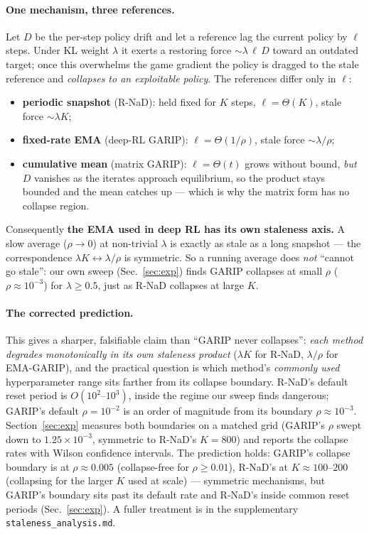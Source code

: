 \documentclass[10pt,twocolumn]{article}
\theoremstyle{plain}
\theoremstyle{remark}
\begin{document}
\paragraph{One mechanism, three references.} Let $D$ be the per-step policy
drift and let a reference lag the current policy by $\ell$ steps. Under KL weight
$\lambda$ it exerts a restoring force $\sim\!\lambda\,\ell\,D$ toward an outdated
target; once this overwhelms the game gradient the policy is dragged to the stale
reference and \emph{collapses to an exploitable policy}. The references differ
only in $\ell$:
\begin{itemize}
  \item \textbf{periodic snapshot} (R-NaD): held fixed for $K$ steps,
  $\ell=\Theta(K)$, stale force $\sim\!\lambda K$;
  \item \textbf{fixed-rate EMA} (deep-RL GARIP): $\ell=\Theta(1/\rho)$, stale
  force $\sim\!\lambda/\rho$;
  \item \textbf{cumulative mean} (matrix GARIP): $\ell=\Theta(t)$ grows without
  bound, \emph{but} $D$ vanishes as the iterates approach equilibrium, so the
  product stays bounded and the mean catches up --- which is why the matrix form
  has no collapse region.
\end{itemize}
Consequently \textbf{the EMA used in deep RL has its own staleness axis.} A slow average ($\rho\!\to\!0$) at non-trivial $\lambda$ is exactly as
stale as a long snapshot --- the correspondence $\lambda K \leftrightarrow
\lambda/\rho$ is symmetric. So a running average does \emph{not} ``cannot go
stale'': our own sweep (Sec.~\ref{sec:exp}) finds GARIP collapses at small $\rho$
($\rho\!\approx\!10^{-3}$) for $\lambda\!\ge\!0.5$, just as R-NaD collapses at
large $K$.

\paragraph{The corrected prediction.} This gives a sharper, falsifiable claim
than ``GARIP never collapses'': \emph{each method degrades monotonically in its
own staleness product} ($\lambda K$ for R-NaD, $\lambda/\rho$ for EMA-GARIP), and
the practical question is which method's \emph{commonly used} hyperparameter
range sits farther from its collapse boundary. R-NaD's default reset period is
$O(10^2\text{--}10^3)$, inside the regime our sweep finds dangerous; GARIP's
default $\rho=10^{-2}$ is an order of magnitude from its boundary
$\rho\!\approx\!10^{-3}$. Section~\ref{sec:exp} measures both boundaries on a
matched grid (GARIP's $\rho$ swept down to $1.25\!\times\!10^{-3}$, symmetric to
R-NaD's $K\!=\!800$) and reports the collapse rates with Wilson confidence
intervals. The prediction holds: GARIP's collapse boundary is at
$\rho\!\approx\!0.005$ (collapse-free for $\rho\!\ge\!0.01$), R-NaD's at
$K\!\approx\!100$--$200$ (collapsing for the larger $K$ used at scale) ---
symmetric mechanisms, but GARIP's boundary sits past its default rate and
R-NaD's inside common reset periods (Sec.~\ref{sec:exp}). A fuller treatment is
in the supplementary \texttt{staleness\_analysis.md}.
\end{document}
